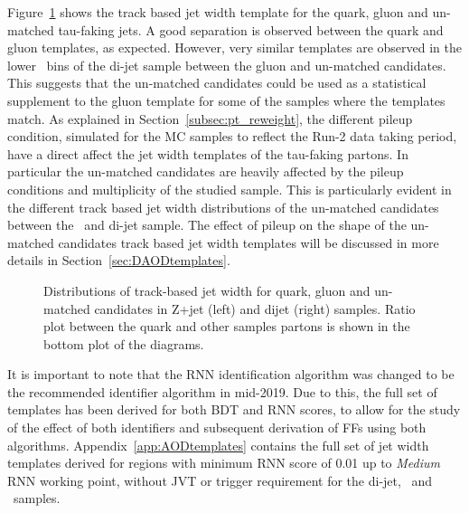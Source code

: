 	Figure~\ref{fig:qgu_jetwidth_template} shows the track based jet width template for the quark, gluon and un-matched tau-faking jets. A good separation is observed between the quark and gluon templates, as expected. However, very similar templates are observed in the lower \pt\ bins of the di-jet sample between the gluon and un-matched candidates. 
	This suggests that the un-matched candidates could be used as a statistical supplement to the gluon template for some of the samples where the templates match.	
	 As explained in Section~\ref{subsec:pt_reweight}, the different pileup condition, simulated for the \ac{MC} samples to reflect the Run-2 data taking period, have a direct affect the jet width templates of the tau-faking partons. In particular the un-matched candidates are heavily affected by the pileup conditions and multiplicity of the  studied sample. This is particularly evident in the different track based jet width distributions of the un-matched candidates between the \Zjets\ and di-jet sample. The effect of pileup on the shape of the un-matched candidates track based jet width templates will be discussed in more details in Section~\ref{sec:DAODtemplates}.
	\begin{figure}[!hbt]
		\begin{center}
			\hspace{0.03\textwidth}
			\hspace{0.03\textwidth}
		\end{center}
		\caption{Distributions of track-based jet width for quark, gluon and un-matched candidates in Z+jet (left) and dijet (right) samples. Ratio plot between the quark and other samples partons is shown in the bottom plot of the diagrams.}
	\label{fig:qgu_jetwidth_template}
	\end{figure}	
	
	It is important to note that the \ac{RNN} identification algorithm was changed to be the recommended identifier algorithm in mid-2019.
	 Due to this, the full set of templates has been derived for both \ac{BDT} and \ac{RNN} scores, to allow for the study of the effect of both identifiers and subsequent derivation of \ac{FF}s using both algorithms. 
	Appendix~\ref{app:AODtemplates} contains the full set of jet width templates derived  for regions with minimum \ac{RNN} score of 0.01 up to \textit{Medium} \ac{RNN} working point, without \ac{JVT} or trigger requirement for the di-jet, \Wjets\ and \Zjets\ samples.
